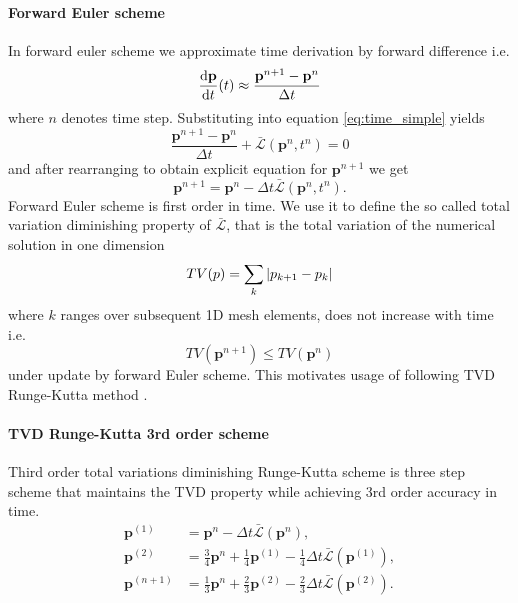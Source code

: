 \paragraph{Forward Euler scheme} In forward euler scheme we approximate time 
derivation by forward difference i.e.
\begin{equation}
	\frac{\text{d}\mathbf{p}}{\text{d}t}(t) \approx 	\frac{\mathbf{p}^{n + 1} - 
	\mathbf{p}^{n}}{\Delta t}
\end{equation}
where $n$ denotes time step. Substituting into equation \eqref{eq:time_simple} 
yields
\begin{equation}
	\frac{\mathbf{p}^{n + 1} - \mathbf{p}^{n}}{\Delta t} + 
	 \bar{\mathcal{L}}(\mathbf{p}^n, t^n) = 0
\end{equation}
and after rearranging to obtain explicit equation for $\mathbf{p}^{n + 1}$ we 
get
\begin{equation}
\mathbf{p}^{n + 1} = \mathbf{p}^{n} - {\Delta t} 
\bar{\mathcal{L}}(\mathbf{p}^n, t^n).
\end{equation}
Forward Euler scheme is first order in time. We use it to define the so called 
total variation diminishing property of $\bar{\mathcal{L}}$, that is the total 
variation of the numerical solution in one dimension
\begin{equation}\label{eq:TV}
	TV(p) = \sum_{k} \left\lvert p_{k + 1} - p_{k}\right\rvert	
\end{equation}
where $k$ ranges over subsequent 1D mesh elements, does not increase with time i.e.
\begin{equation}
	TV(\mathbf{p}^{n + 1}) \leq TV(\mathbf{p}^{n})
\end{equation}
under update by forward Euler scheme.
This motivates usage of following TVD Runge-Kutta method \cite[p. 73]{Gottlieb2002}. 



\paragraph{TVD Runge-Kutta 3rd order scheme}
Third order total variations diminishing Runge-Kutta scheme \cite{Gottlieb2002} 
is three step scheme that maintains the TVD property while achieving 3rd order 
accuracy in time.
\begin{equation}	
	\begin{aligned}
		\mathbf{p}^{(1)} &= \mathbf{p}^n - \Delta t  
		\bar{\mathcal{L}}(\mathbf{p}^n), \\
		\mathbf{\mathbf{p}}^{(2)} &= \frac{3}{4}\mathbf{p}^n 
		+\frac{1}{4}\mathbf{p}^{(1)} - \frac{1}{4}\Delta t 
		 \bar{\mathcal{L}}(\mathbf{p}^{(1)}),\\
		\mathbf{p}^{(n+1)} &= \frac{1}{3}\mathbf{p}^n 
		+\frac{2}{3}\mathbf{p}^{(2)} - \frac{2}{3}\Delta t 
		 \bar{\mathcal{L}}(\mathbf{p}^{(2)}).
	\end{aligned}
\end{equation}


